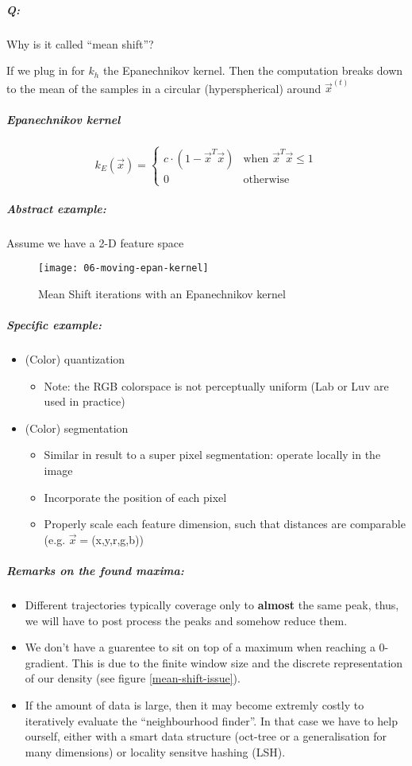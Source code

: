 \subparagraph{Q:} Why is it called ``mean shift''?

If we plug in for $k_h$ the Epanechnikov kernel. Then the computation breaks down to the mean of the samples in a circular (hyperspherical) around $\vec{x}^{(t)}$

\subparagraph{Epanechnikov kernel}

\begin{equation*}
  k_E(\vec{x}) = \begin{cases}
    c \cdot (1 - \vec{x}^T \vec{x})&\text{when } \vec{x}^T \vec{x} \le 1\\
    0 &\text{otherwise}
  \end{cases}
\end{equation*}

\subparagraph{Abstract example:}
Assume we have a 2-D feature space

\begin{figure}[H]
  \centering
  \texttt{[image: 06-moving-epan-kernel]}
  \caption{Mean Shift iterations with an Epanechnikov kernel}
\end{figure}

\subparagraph{Specific example:}
\begin{itemize}
  \item (Color) quantization
    \begin{itemize}
      \item Note: the RGB colorspace is not perceptually uniform (Lab or Luv are used in practice)
    \end{itemize}
  \item (Color) segmentation
    \begin{itemize}
      \item Similar in result to a super pixel segmentation: operate locally in the image
      \item Incorporate the position of each pixel
      \item Properly scale each feature dimension, such that distances are comparable (e.g. $\vec{x} = $(x,y,r,g,b))
    \end{itemize}
\end{itemize}

\subparagraph{Remarks on the found maxima:}
\begin{itemize}
  \item Different trajectories typically coverage only to \textbf{almost} the same peak, thus, we will have to post process the peaks and somehow reduce them.
  \item We don't have a guarentee to sit on top of a maximum when reaching a 0-gradient. This is due to the finite window size and the discrete representation of our density (see figure \ref{mean-shift-issue}).
  \item \label{mean-shift-cost-effectiveness} If the amount of data is large, then it may become extremly costly to iteratively evaluate the ``neighbourhood finder''. In that case we have to help ourself, either with a smart data structure (oct-tree or a generalisation for many dimensions) or locality sensitve hashing (LSH).
\end{itemize}
